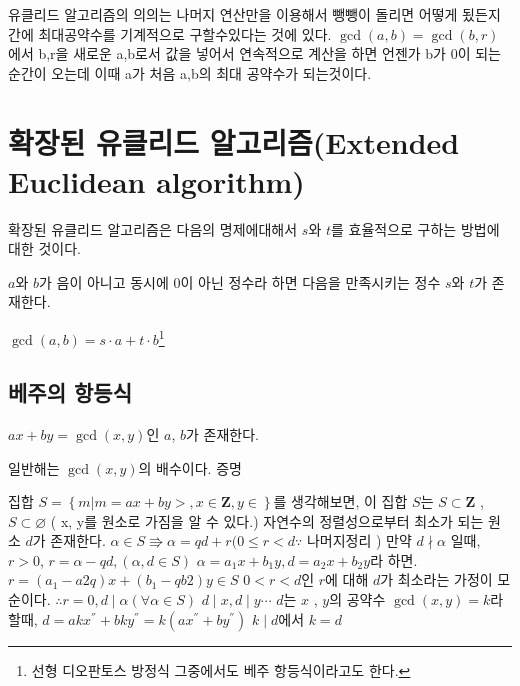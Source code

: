 \documentclass{oblivoir}
\begin{document}
\vspace{1\baselineskip}

유클리드 알고리즘의 의의는 나머지 연산만을 이용해서 뺑뺑이 돌리면 어떻게 됬든지 간에 최대공약수를 기계적으로 구할수있다는 것에 있다. $\gcd(a,b) = \gcd(b,r)$에서 b,r을 새로운 a,b로서 값을 넣어서 연속적으로 계산을 하면 언젠가 b가 0이 되는 순간이 오는데 이때 a가 처음 a,b의 최대 공약수가 되는것이다.
\newpage

\section{확장된 유클리드 알고리즘(Extended Euclidean algorithm)} 
확장된 유클리드 알고리즘은 다음의 명제에대해서 $s$와 $t$를 효율적으로 구하는 방법에대한 것이다. 
\begin{justbox}
$a$와 $b$가 음이 아니고 동시에 0이 아닌 정수라 하면 다음을 만족시키는 정수 $s$와 $t$가 존재한다.
\begin{center}
    $\gcd(a,b) = s\cdot a + t\cdot b$\footnote{선형 디오판토스 방정식 그중에서도 베주 항등식이라고도 한다.}
\end{center}
\end{justbox}

\subsection{베주의 항등식}\par
$ax + by =\gcd(x, y)$인 $a$, $b$가 존재한다.\par
일반해는 $\gcd(x ,y)$의 배수이다.
증명\par 
집합 $S = \left\{ m | m =ax+by> , x\in \mathbf{Z} , y \in  \right\}$를 생각해보면, 이 집합 $S$는 $S \subset \mathbf{Z}$ ,  $S \subset \varnothing$ ( x, y를 원소로 가짐을 알 수 있다.) 자연수의 정렬성으로부터 최소가 되는 원소 $d$가 존재한다.
$\alpha \in S \Rrightarrow \alpha = qd+r (0 \le r < d \because$ 나머지정리 )
만약 $d \nmid \alpha$ 일때, $r > 0$,
$ r = \alpha - qd , (\alpha , d \in S)$ 
$\alpha = a_{1}x+b_{1}y , d=a_{2}x+b_{2}y$라 하면. $r=(a_{1}-a{2}q)x + (b_{1}-qb{2})y \in S $
$0 < r < d$인 $r$에 대해 $d$가 최소라는 가정이 모순이다. $\therefore r = 0 , d \mid \alpha (\forall \alpha \in S)$
$ d \mid x, d \mid y \cdots$ $d$는  $x$ , $y$의 공약수
$\gcd(x, y)=k $라 할때, $d = akx^{''}+bky^{''}=k(ax^{''}+by^{''})$
$k \mid d$에서 $ k = d$
\end{document}
